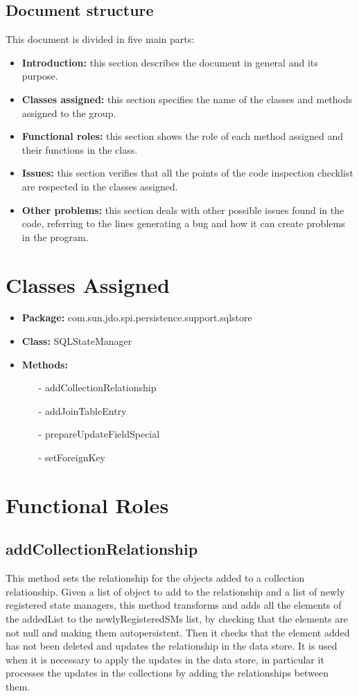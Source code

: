 \documentclass[18pt,oneside,a4paper, titlepage]{article}
\begin{document}
	\subsection{Document structure}
		This document is divided in five main parts:
		\begin{itemize}
			\item \textbf{Introduction:} this section describes the document in general and its purpose.
			\item  \textbf{Classes assigned:} this section specifies the name of the classes and methods assigned to the group.
			\item  \textbf{Functional roles:} this section shows the role of each method assigned and their functions in the class.
			\item  \textbf{Issues:} this section verifies that all the points of the code inspection checklist are respected in the classes assigned.
			\item  \textbf{Other problems:} this section deals with other possible issues found in the code, referring to the lines generating a bug and how it can create problems in the program.
		\end{itemize}

\newpage	
\section{Classes Assigned}
	\begin{itemize}
		\item  \textbf{Package:} com.sun.jdo.spi.persistence.support.sqlstore
		\item  \textbf{Class:} SQLStateManager
		\item  \textbf{Methods:}
			\begin{itemize}
				\item[-] addCollectionRelationship
				\item[-] addJoinTableEntry
				\item[-] prepareUpdateFieldSpecial
				\item[-] setForeignKey
			\end{itemize}
	\end{itemize}
		
\newpage
\section{Functional Roles}
	\subsection{addCollectionRelationship}
	This method sets the relationship for the objects added to a collection relationship. Given a list of object to add to the relationship and a list of newly registered state managers, this method transforms and adds all the elements of the addedList to the newlyRegisteredSMs list, by checking that the elements are not null and making them autopersistent. Then it checks that the element added has not been deleted and updates the relationship in the data store.
	It is used when it is necessary to apply the updates in the data store, in particular it processes the updates in the collections by adding the relationships between them.
	
\end{document}

